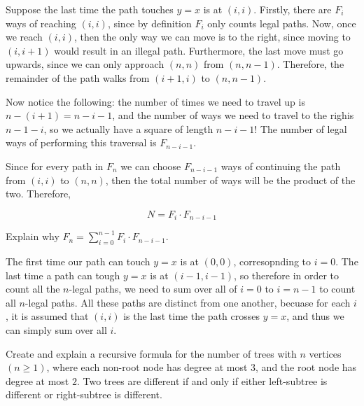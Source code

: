 \documentclass[11pt]{article}
\begin{document}
\begin{ResumeParts}
\begin{solution}
  Suppose the last time the path touches $y = x$ is at $(i, i)$. Firstly, there are $F_i$ ways of reaching $(i, i)$, since by definition $F_i$ only counts legal paths. Now, once we reach $(i, i)$, then the only way we can move is to the right, since moving to $(i, i+1)$ would result in an illegal path. Furthermore, the last move must go upwards, since we can only approach $(n, n)$ from $(n, n-1)$. Therefore, the remainder of the path walks from $(i+1, i)$ to $(n, n-1)$. 

  Now notice the following: the number of times we need to travel up is $n - (i + 1) = n - i - 1$, and the number of ways we need to travel to the righis $n - 1 - i$, so we actually have a square of length $n - i - 1$! The number of legal ways of performing this traversal is $F_{n - i - 1}$.

  Since for every path in $F_n$ we can choose $F_{n - i - 1}$ ways of continuing the path from $(i, i)$ to $(n , n)$, then the total number of ways will be the product of the two. Therefore, 

  \[ N = F_i \cdot F_{n - i - 1}\]

  
\end{solution}

\Part Explain why $F_n = \sum_{i = 0}^{n - 1} F_i \cdot F_{n - i - 1}$.

\begin{solution}
  The first time our path can touch $y = x$ is at $(0, 0)$, corresopnding to $i = 0$. The last time a path can tough $y =x$ is at $(i -1, i-1)$, so therefore in order to count all the $n$-legal paths, we need to sum over all of $i = 0$ to $i= n-1$ to count all $n$-legal paths. All these paths are distinct from one another, becuase for each $i$, it is assumed that $(i, i)$ is the last time the path crosses $y =x$, and thus we can simply sum over all $i$.
\end{solution}

\Part Create and explain a recursive formula for the number of trees with $n$ vertices $(n \geq 1)$, where each non-root node has degree at most $3$, and the root node has degree at most $2$. Two trees are different if and only if either left-subtree is
different or right-subtree is different.


\end{ResumeParts}
\end{document}
